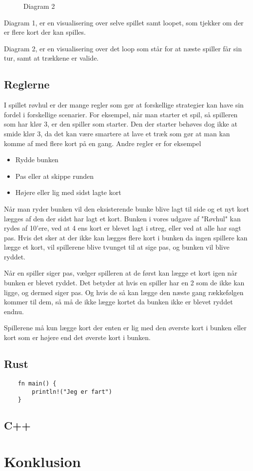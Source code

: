 \documentclass[a4paper, 12pt]{article}
\begin{document}
\begin{figure}[H]
	\centering
	
	\caption{Diagram 2}
\end{figure}

Diagram 1, er en visualisering over selve spillet samt loopet, som tjekker om der er flere kort der kan spilles.
\bigbreak

Diagram 2, er en visualisering over det loop som står for at næste spiller får sin tur, samt at trækkene er valide.

\vfill
\pagebreak


\subsection{Reglerne}
I spillet røvhul er der mange regler som gør at forskellige strategier kan have sin fordel i forskellige scenarier. For eksempel, når man starter et spil, så spilleren som har klør 3, er den spiller som starter. Den der starter behøves dog ikke at smide klør 3, da det kan være smartere at lave et træk som gør at man kan komme af med flere kort på en gang. Andre regler er for eksempel

\begin{itemize}
	\item Rydde bunken
	\item Pas eller at skippe runden
	\item Højere eller lig med sidst lagte kort
\end{itemize}

Når man ryder bunken vil den eksisterende bunke blive lagt til side og et nyt kort lægges af den der sidst har lagt et kort. Bunken i vores udgave af "Røvhul" kan rydes af 10'ere, ved at 4 ens kort er blevet lagt i streg, eller ved at alle har sagt pas. Hvis det sker at der ikke kan lægges flere kort i bunken da ingen spillere kan lægge et kort, vil spillerene blive tvunget til at sige pas, og bunken vil blive ryddet.

Når en spiller siger pas, vælger spilleren at de først kan lægge et kort igen når bunken er blevet ryddet. Det betyder at hvis en spiller har en 2 som de ikke kan ligge, og dermed siger pas. Og hvis de så kan lægge den næste gang rækkefølgen kommer til dem, så må de ikke lægge kortet da bunken ikke er blevet ryddet endnu.

Spillerene må kun lægge kort der enten er lig med den øverste kort i bunken eller kort som er højere end det øverste kort i bunken.

\subsection{Rust}


\begin{verbatim}
	fn main() {
		println!("Jeg er fart")
	}
\end{verbatim}


\subsection{C++}


\vfill
\pagebreak

\section{Konklusion}

\vfill
\pagebreak
\end{document}
